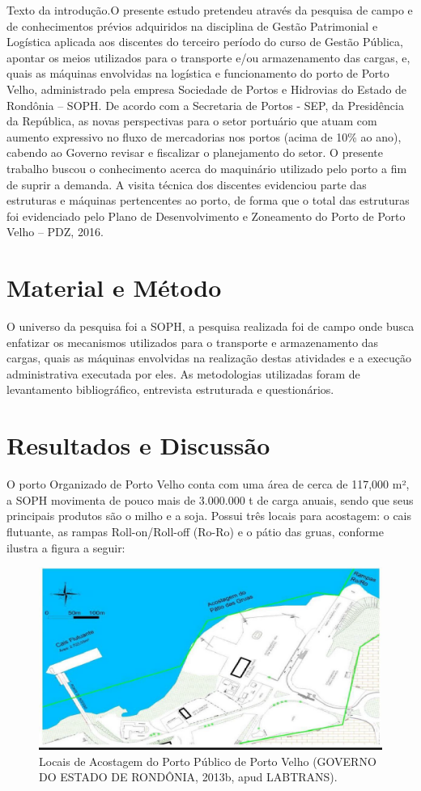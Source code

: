 \documentclass[article,12pt,onesidea,4paper,english,brazil]{abntex2}
\begin{document}
	Texto da introdução.O presente estudo pretendeu através da pesquisa de campo e de conhecimentos prévios adquiridos na disciplina de Gestão Patrimonial e Logística aplicada aos discentes do terceiro período do curso de Gestão Pública, apontar os meios utilizados para o transporte e/ou armazenamento das cargas, e, quais as máquinas envolvidas na logística e funcionamento do porto de Porto Velho, administrado pela empresa Sociedade de Portos e Hidrovias do Estado de Rondônia
	– SOPH. De acordo com a Secretaria de Portos - SEP, da Presidência da República, as novas perspectivas para o setor portuário que atuam com aumento expressivo no fluxo de mercadorias nos portos (acima de 10\% ao ano), cabendo ao Governo revisar e fiscalizar o planejamento do setor. O presente trabalho buscou o conhecimento acerca do maquinário utilizado pelo porto a fim de suprir a demanda. A visita técnica dos discentes evidenciou parte das estruturas e máquinas pertencentes ao porto, de forma que o total das estruturas foi evidenciado pelo Plano de Desenvolvimento e Zoneamento do Porto de Porto Velho – PDZ, 2016.	
	\section*{Material e Método}
	
O universo da pesquisa foi a SOPH, a pesquisa realizada foi de campo onde busca enfatizar os mecanismos utilizados para o transporte e armazenamento das cargas, quais as máquinas envolvidas na realização destas atividades e a execução administrativa executada por eles. As metodologias utilizadas foram de levantamento bibliográfico, entrevista estruturada e questionários.
	
	\section*{Resultados e Discussão}
	
	O porto Organizado de Porto Velho conta com uma área de cerca de 117,000 m², a SOPH movimenta de pouco mais de 3.000.000 t de carga anuais, sendo que seus principais produtos são o milho e a soja. Possui três locais para acostagem: o cais flutuante, as rampas Roll-on/Roll-off (Ro-Ro) e o pátio das gruas, conforme ilustra a figura a seguir:
	
	\begin{figure}[!h]
		\centering
		\includegraphics[width=.8\linewidth]{pip-178-01}
		\caption{Locais de Acostagem do Porto Público de Porto Velho (GOVERNO DO ESTADO DE RONDÔNIA, 2013b, apud LABTRANS).}
	\end{figure}
\end{document}
